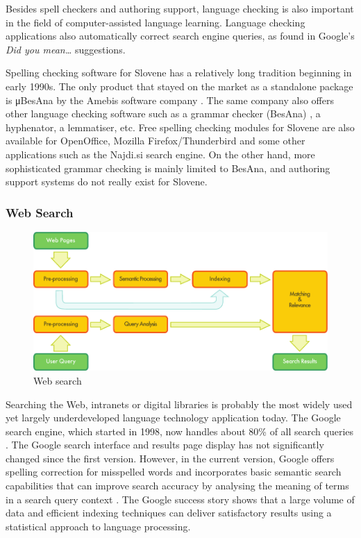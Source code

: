 \begin{multicols}{2}
Besides spell checkers and authoring support, language checking is also important in the field of computer-assisted language learning. Language checking applications also automatically correct search engine queries, as found in Google's \textit{Did you mean…} suggestions.



Spelling checking software for Slovene has a relatively long tradition beginning in early 1990s. The only product that stayed on the market as a standalone package is μBesAna by the Amebis software company \cite{Amb1}. The same company also offers other language checking software such as a grammar checker (BesAna) \cite{Amb2}, a hyphenator, a lemmatiser, etc. Free spelling checking modules for Slovene are also available for OpenOffice, Mozilla Firefox/Thunderbird and some other applications such as the Najdi.si search engine. On the other hand, more sophisticated grammar checking is mainly limited to BesAna, and authoring support systems do not really exist for Slovene.

\subsubsection{Web Search}

\begin{figure}[htb]
  \center
  \includegraphics[width=\textwidth]{../_media/english/web_search_architecture}
  \caption{Web search}
  \label{fig:websearcharch_en}
 \end{figure}

Searching the Web, intranets or digital libraries is probably the most widely used yet largely underdeveloped language technology application today. The Google search engine, which started in 1998, now handles about 80\% of all search queries \cite{spi1}. The Google search interface and results page display has not significantly changed since the first version. However, in the current version, Google offers spelling correction for misspelled words and incorporates basic semantic search capabilities that can improve search accuracy by analysing the meaning of terms in a search query context \cite{pc1}. The Google success story shows that a large volume of data and efficient indexing techniques can deliver satisfactory results using a statistical approach to language processing. 


\end{multicols}
